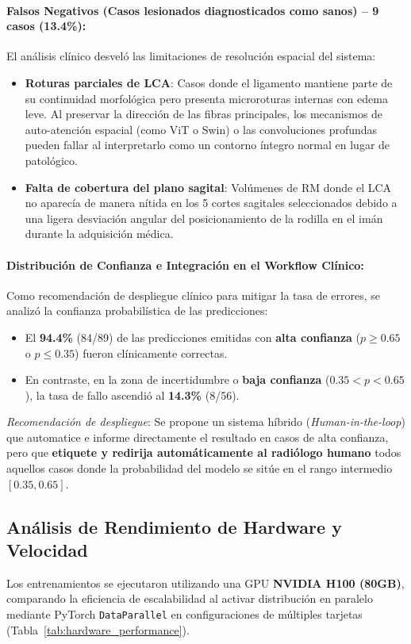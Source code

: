 \paragraph{Falsos Negativos (Casos lesionados diagnosticados como sanos) -- 9 casos (13.4\%):}
El análisis clínico desveló las limitaciones de resolución espacial del sistema:
\begin{itemize}
    \item \textbf{Roturas parciales de LCA}: Casos donde el ligamento mantiene parte de su continuidad morfológica pero presenta microroturas internas con edema leve. Al preservar la dirección de las fibras principales, los mecanismos de auto-atención espacial (como ViT o Swin) o las convoluciones profundas pueden fallar al interpretarlo como un contorno íntegro normal en lugar de patológico.
    \item \textbf{Falta de cobertura del plano sagital}: Volúmenes de RM donde el LCA no aparecía de manera nítida en los 5 cortes sagitales seleccionados debido a una ligera desviación angular del posicionamiento de la rodilla en el imán durante la adquisición médica.
\end{itemize}

\paragraph{Distribución de Confianza e Integración en el Workflow Clínico:}
Como recomendación de despliegue clínico para mitigar la tasa de errores, se analizó la confianza probabilística de las predicciones:
\begin{itemize}
    \item El \textbf{94.4\%} (84/89) de las predicciones emitidas con \textbf{alta confianza} ($p \geq 0.65$ o $p \leq 0.35$) fueron clínicamente correctas.
    \item En contraste, en la zona de incertidumbre o \textbf{baja confianza} ($0.35 < p < 0.65$), la tasa de fallo ascendió al \textbf{14.3\%} (8/56).
\end{itemize}
\textit{Recomendación de despliegue}: Se propone un sistema híbrido (\textit{Human-in-the-loop}) que automatice e informe directamente el resultado en casos de alta confianza, pero que \textbf{etiquete y redirija automáticamente al radiólogo humano} todos aquellos casos donde la probabilidad del modelo se sitúe en el rango intermedio $[0.35, 0.65]$.

\subsection{Análisis de Rendimiento de Hardware y Velocidad}
Los entrenamientos se ejecutaron utilizando una GPU \textbf{NVIDIA H100 (80GB)}, comparando la eficiencia de escalabilidad al activar distribución en paralelo mediante PyTorch \texttt{DataParallel} en configuraciones de múltiples tarjetas (Tabla~\ref{tab:hardware_performance}).

